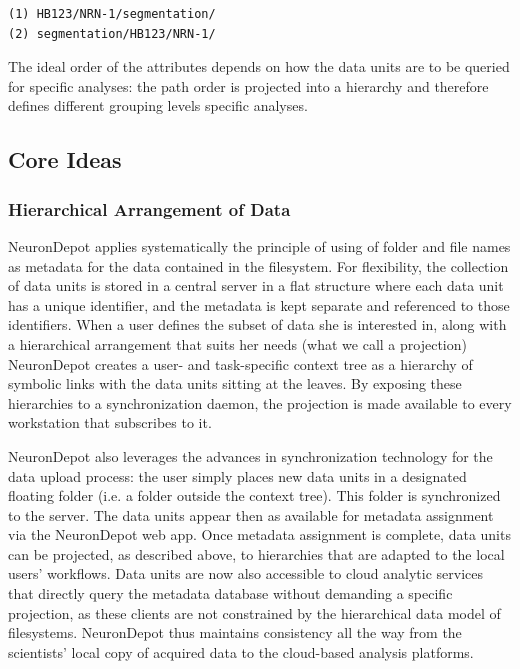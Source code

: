 \documentclass{frontiersSCNS} %
\begin{document}
\begin{lstlisting}[style=display]
(1) HB123/NRN-1/segmentation/
(2) segmentation/HB123/NRN-1/
\end{lstlisting}


The ideal order of the attributes depends on how the data units are to be
queried for specific analyses: the path order is projected into a hierarchy and
therefore defines different grouping levels specific analyses.

\subsection{Core Ideas}
\subsubsection{Hierarchical Arrangement of Data}

NeuronDepot applies systematically the principle of using of folder and file
names as metadata for the data contained in the filesystem. For flexibility,
the collection of data units is stored in a central server in a flat structure
where each data unit has a unique identifier, and the metadata is kept separate
and referenced to those identifiers. When a user defines the subset of data she
is interested in, along with a hierarchical arrangement that suits her needs
(what we call a projection) NeuronDepot creates a user- and task-specific
context tree as a hierarchy of symbolic links with the data units sitting at
the leaves. By exposing these hierarchies to a synchronization daemon, the
projection is made available to every workstation that subscribes to it.

NeuronDepot also leverages the advances in synchronization technology for the
data upload process: the user simply places new data units in a designated
floating folder (i.e. a folder outside the context tree). This folder is
synchronized to the server. The data units appear then as available for
metadata assignment via the NeuronDepot web app. Once metadata assignment is
complete, data units can be projected, as described above, to hierarchies that
are adapted to the local users' workflows. Data units are now also accessible
to cloud analytic services that directly query the metadata database without
demanding a specific projection, as these clients are not constrained by the
hierarchical data model of filesystems. NeuronDepot thus maintains consistency
all the way from the scientists' local copy of acquired data to the cloud-based
analysis platforms.
\end{document}
